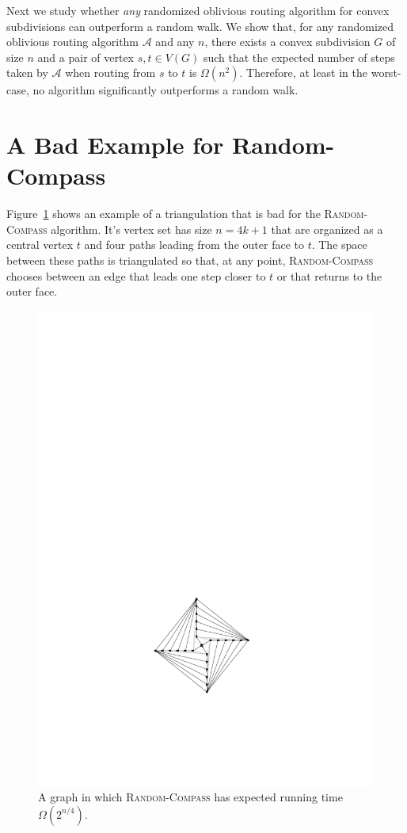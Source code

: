 \documentclass [letterpaper] {patmorin}
\begin{document}
Next we study whether \emph{any} randomized oblivious routing algorithm for convex subdivisions can outperform a random walk.  We show that, for any randomized oblivious routing algorithm $\mathcal{A}$ and any $n$, there exists a convex subdivision $G$ of size $n$ and a pair of vertex $s,t\in V(G)$ such that the expected number of steps taken by $\mathcal{A}$ when routing from $s$ to $t$ is $\Omega(n^2)$.  Therefore, at least in the worst-case, no algorithm significantly outperforms a random walk.

\section{A Bad Example for Random-Compass}

Figure~\ref{fig:bad-unbiased} shows an example of a triangulation that is
bad for the \textsc{Random-Compass} algorithm.  It's vertex set has size
$n=4k+1$ that are organized as a central vertex $t$ and four paths leading
from the outer face to $t$.  The space between these paths is triangulated
so that, at any point, \textsc{Random-Compass} chooses between an edge
that leads one step closer to $t$ or that returns to the outer face.

\begin{figure}
  \begin{center}
    \includegraphics{pics/bad-unbiased}
  \end{center}
  \caption{A graph in which \textsc{Random-Compass} has expected running time 
           $\Omega(2^{n/4})$.}
  \label{fig:bad-unbiased}
\end{figure}
\end{document}
